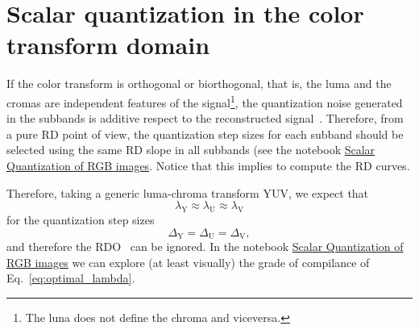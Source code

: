 \section{Scalar quantization in the color transform domain}

If the color transform is orthogonal or biorthogonal, that is, the
luma and the cromas are independent features of the
signal\footnote{The luna does not define the chroma and viceversa.},
the quantization noise generated in the subbands is additive respect
to the reconstructed signal~\cite{burger2016digital}. Therefore, from
a pure RD point of view, the quantization step sizes for each subband
should be selected using the same RD slope in all subbands (see the
notebook
\href{https://github.com/vicente-gonzalez-ruiz/color_transforms/blob/main/docs/RGB/RGB_SQ.ipynb}{Scalar
  Quantization of RGB images}. Notice that this implies to compute the
RD curves.

Therefore, taking a generic luma-chroma transform $\text{YUV}$, we
expect that
\begin{equation}
  \lambda_{\text{Y}} \approx \lambda_{\text{U}} \approx \lambda_{\text{V}}
  \label{eq:optimal_lambda}
\end{equation}
for the quantization step sizes
\begin{equation}
  \Delta_{\text{Y}} = \Delta_{\text{U}} = \Delta_{\text{V}},
  \label{eq:optimal_delta}
\end{equation}
and therefore the RDO~\cite{vruiz__information_theory} can be
ignored. In the notebook
\href{https://github.com/Sistemas-Multimedia/Sistemas-Multimedia.github.io/blob/master/contents/RGB_SQ/RGB_SQ.ipynb}{Scalar
  Quantization of RGB images} we can explore (at least visually) the
grade of compilance of Eq.~\eqref{eq:optimal_lambda}.

